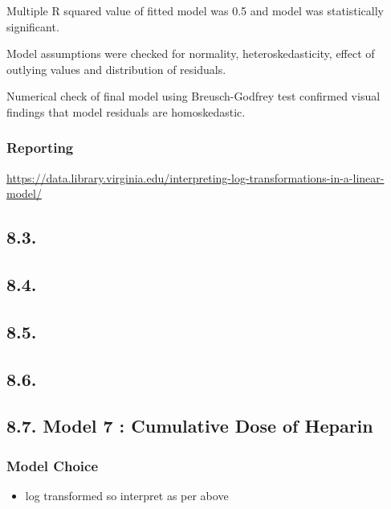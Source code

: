 \documentclass[
]{article}
\providecommand{\tightlist}{%
  \setlength{\itemsep}{0pt}\setlength{\parskip}{0pt}}
\begin{document}
Multiple R squared value of fitted model was 0.5 and model was
statistically significant.

Model assumptions were checked for normality, heteroskedasticity, effect
of outlying values and distribution of residuals.

Numerical check of final model using Breusch-Godfrey test confirmed
visual findings that model residuals are homoskedastic.

\hypertarget{reporting}{%
\subsubsection{Reporting}\label{reporting}}

\url{https://data.library.virginia.edu/interpreting-log-transformations-in-a-linear-model/}

\hypertarget{section-1}{%
\subsection{8.3.}\label{section-1}}

\hypertarget{section-2}{%
\subsection{8.4.}\label{section-2}}

\hypertarget{section-3}{%
\subsection{8.5.}\label{section-3}}

\hypertarget{section-4}{%
\subsection{8.6.}\label{section-4}}

\hypertarget{model-7-cumulative-dose-of-heparin}{%
\subsection{8.7. Model 7 : Cumulative Dose of
Heparin}\label{model-7-cumulative-dose-of-heparin}}

\hypertarget{model-choice}{%
\subsubsection{Model Choice}\label{model-choice}}

\begin{itemize}
\tightlist
\item
  log transformed so interpret as per above
\end{itemize}
\end{document}
